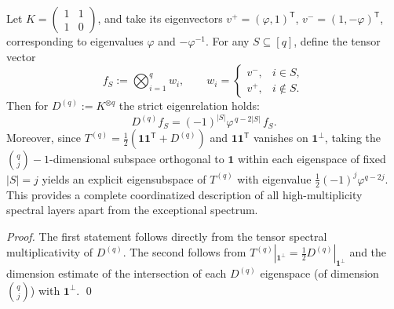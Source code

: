 \begin{theorem}\label{thm:pom-replica-softcore-tensor-eigenbasis}
Let
\(
K=\begin{pmatrix}1&1\\[2pt]1&0\end{pmatrix}
\),
and take its eigenvectors
\(
v^+=(\varphi,1)^{\mathsf T}
\), \(
v^-=(1,-\varphi)^{\mathsf T}
\), corresponding to eigenvalues \(\varphi\) and \(-\varphi^{-1}\).
For any \(S\subseteq[q]\), define the tensor vector
\[
f_S:=\bigotimes_{i=1}^{q} w_i,\qquad
w_i=
\begin{cases}
v^-,& i\in S,\\
v^+,& i\notin S.
\end{cases}
\]
Then for \(D^{(q)}:=K^{\otimes q}\) the strict eigenrelation holds:
\[
D^{(q)}f_S = (-1)^{|S|}\varphi^{\,q-2|S|}\,f_S.
\]
Moreover, since
\(
T^{(q)}=\tfrac12(\mathbf{1}\mathbf{1}^{\mathsf T}+D^{(q)})
\)
and \(\mathbf{1}\mathbf{1}^{\mathsf T}\) vanishes on \(\mathbf{1}^\perp\),
taking the \(\binom{q}{j}-1\)-dimensional subspace orthogonal to \(\mathbf{1}\) within each eigenspace of fixed \(|S|=j\)
yields an explicit eigensubspace of \(T^{(q)}\) with eigenvalue
\(
\tfrac12(-1)^j\varphi^{q-2j}
\).
This provides a complete coordinatized description of all high-multiplicity spectral layers apart from the exceptional spectrum.
\end{theorem}
\begin{proof}
The first statement follows directly from the tensor spectral multiplicativity of \(D^{(q)}\).
The second follows from
\(
T^{(q)}|_{\mathbf{1}^\perp}=\frac12 D^{(q)}|_{\mathbf{1}^\perp}
\)
and the dimension estimate of the intersection of each \(D^{(q)}\) eigenspace (of dimension \(\binom{q}{j}\)) with \(\mathbf{1}^\perp\). \qed
\end{proof}

